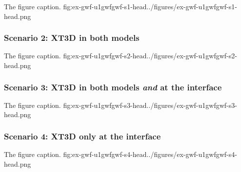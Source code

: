 \begin{StandardFigure}{
                                     The figure caption.
                                     }{fig:ex-gwf-u1gwfgwf-s1-head}{../figures/ex-gwf-u1gwfgwf-s1-head.png}
\end{StandardFigure}   


\subsubsection{Scenario 2: XT3D in both models}

\begin{StandardFigure}{
                                     The figure caption.
                                     }{fig:ex-gwf-u1gwfgwf-s2-head}{../figures/ex-gwf-u1gwfgwf-s2-head.png}
\end{StandardFigure}


\subsubsection{Scenario 3: XT3D in both models \emph{and} at the interface}

\begin{StandardFigure}{
                                     The figure caption.
                                     }{fig:ex-gwf-u1gwfgwf-s3-head}{../figures/ex-gwf-u1gwfgwf-s3-head.png}
\end{StandardFigure}


\subsubsection{Scenario 4: XT3D only at the interface}

\begin{StandardFigure}{
                                     The figure caption.
                                     }{fig:ex-gwf-u1gwfgwf-s4-head}{../figures/ex-gwf-u1gwfgwf-s4-head.png}
\end{StandardFigure}
